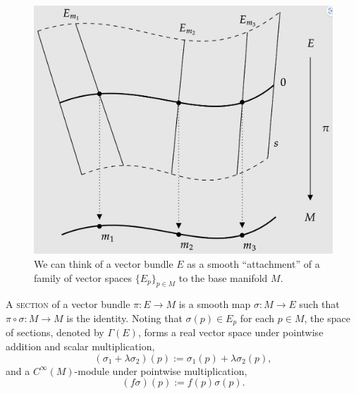 \documentclass[reqno]{amsart}
\theoremstyle{definition}
\theoremstyle{remark}
\renewcommand{\emph}{\textsc}
\begin{document}
\begin{figure}[h]
	\begin{center}
		\includegraphics[scale = 0.3]{bundle}
		\caption{We can think of a vector bundle $E$ as a smooth ``attachment'' of a family of vector spaces $\{E_p\}_{p \in M}$ to the base manifold $M$.}
	\end{center}	
\end{figure}

A \emph{section} of a vector bundle $\pi : E \to M$ is a smooth map $\sigma : M \to E$ such that $\pi \circ \sigma : M \to M$ is the identity. 
Noting that $\sigma(p) \in E_p$ for each $p \in M$, the space of sections, denoted by $\Gamma (E)$, forms a real vector space under pointwise addition and scalar multiplication, 
	\[ (\sigma_1 + \lambda \sigma_2) (p) := \sigma_1 (p) + \lambda \sigma_2 (p), \]
and a $C^\infty (M)$-module under pointwise multiplication, 
	\[  (f\sigma)(p) := f(p) \sigma(p). \]
	
\end{document}
